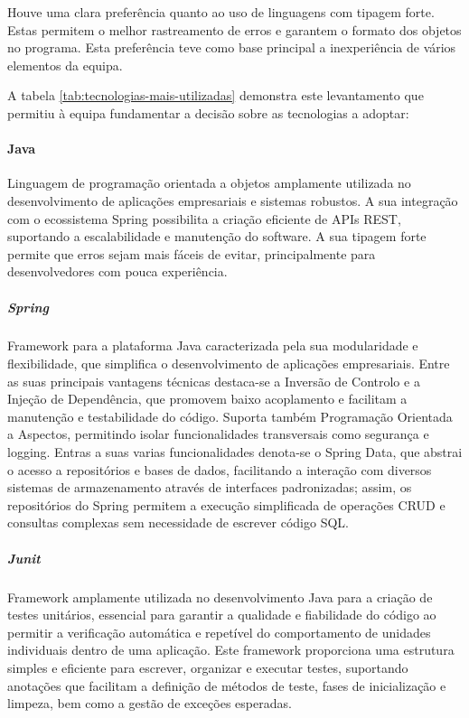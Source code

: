 

Houve uma clara preferência quanto ao uso de linguagens com tipagem forte. Estas permitem o melhor rastreamento de erros e garantem o formato dos objetos no programa. Esta preferência teve como base principal a inexperiência de vários elementos da equipa.

A tabela \ref{tab:tecnologias-mais-utilizadas} demonstra este levantamento que permitiu à equipa fundamentar a decisão sobre as tecnologias a adoptar:

\paragraph{Java} Linguagem de programação orientada a objetos amplamente utilizada no desenvolvimento de aplicações empresariais e sistemas robustos. A sua integração com o ecossistema Spring possibilita a criação eficiente de APIs REST, suportando a escalabilidade e manutenção do software. A sua tipagem forte permite que erros sejam mais fáceis de evitar, principalmente para desenvolvedores com pouca experiência.  

\subparagraph{Spring} Framework para a plataforma Java caracterizada pela sua modularidade e flexibilidade, que simplifica o desenvolvimento de aplicações empresariais. Entre as suas principais vantagens técnicas destaca-se a Inversão de Controlo e a Injeção de Dependência, que promovem baixo acoplamento e facilitam a manutenção e testabilidade do código. Suporta também Programação Orientada a Aspectos, permitindo isolar funcionalidades transversais como segurança e logging. Entras a suas varias funcionalidades denota-se o Spring Data, que abstrai o acesso a repositórios e bases de dados, facilitando a interação com diversos sistemas de armazenamento através de interfaces padronizadas; assim, os repositórios do Spring permitem a execução simplificada de operações CRUD e consultas complexas sem necessidade de escrever código SQL.

\subparagraph{Junit} Framework amplamente utilizada no desenvolvimento Java para a criação de testes unitários, essencial para garantir a qualidade e fiabilidade do código ao permitir a verificação automática e repetível do comportamento de unidades individuais dentro de uma aplicação. Este framework proporciona uma estrutura simples e eficiente para escrever, organizar e executar testes, suportando anotações que facilitam a definição de métodos de teste, fases de inicialização e limpeza, bem como a gestão de exceções esperadas.

